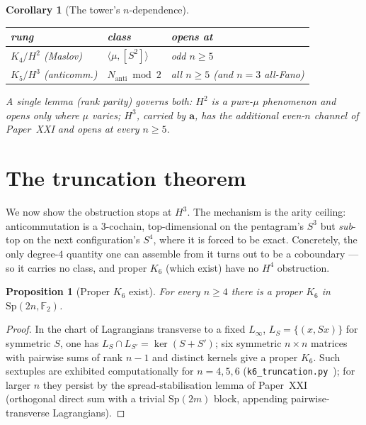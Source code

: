 \documentclass[11pt,a4paper]{article}
\newcommand{\Nanti}{N_{\mathrm{anti}}}
\newcommand{\Sp}{\mathrm{Sp}}
\newcommand{\F}{\mathbb{F}}
\theoremstyle{plain}
\newtheorem{corollary}[theorem]{Corollary}
\newtheorem{proposition}[theorem]{Proposition}
\theoremstyle{definition}
\theoremstyle{remark}
\begin{document}
\begin{corollary}[The tower's $n$-dependence]\label{cor:ndep}
\begin{center}
\renewcommand{\arraystretch}{1.2}
\begin{tabular}{lll}
\toprule
rung & class & opens at \\
\midrule
$K_4/H^2$ (Maslov) & $\langle\mu,[S^2]\rangle$ & odd $n\ge5$ \\
$K_5/H^3$ (anticomm.) & $\Nanti\bmod2$ & all $n\ge5$ \;(and $n=3$ all-Fano)\\
\bottomrule
\end{tabular}
\end{center}
A single lemma (rank parity) governs both: $H^2$ is a pure-$\mu$ phenomenon and opens
only where $\mu$ varies; $H^3$, carried by $\mathbf a$, has the additional
even-$n$ channel of Paper~XXI and opens at every $n\ge5$.
\end{corollary}

\section{The truncation theorem}\label{sec:trunc}

We now show the obstruction stops at $H^3$.  The mechanism is the arity ceiling:
anticommutation is a $3$-cochain, top-dimensional on the pentagram's $S^3$ but
\emph{sub}-top on the next configuration's $S^4$, where it is forced to be exact.
Concretely, the only degree-$4$ quantity one can assemble from it turns out to be a
coboundary --- so it carries no class, and proper $K_6$ (which exist) have no
$H^4$ obstruction.

\begin{proposition}[Proper $K_6$ exist]\label{prop:k6exist}
For every $n\ge4$ there is a proper $K_6$ in $\Sp(2n,\F_2)$.
\end{proposition}

\begin{proof}
In the chart of Lagrangians transverse to a fixed $L_\infty$, $L_S=\{(x,Sx)\}$ for
symmetric $S$, one has $L_S\cap L_{S'}=\ker(S+S')$; six symmetric $n\times n$
matrices with pairwise sums of rank $n-1$ and distinct kernels give a proper $K_6$.
Such sextuples are exhibited computationally for $n=4,5,6$
(\texttt{k6\_truncation.py}~\cite{PaperXXIIsuppl}); for larger $n$ they persist by
the spread-stabilisation lemma of Paper~XXI~\cite{PaperXXI} (orthogonal direct sum
with a trivial $\Sp(2m)$ block, appending pairwise-transverse Lagrangians).
\end{proof}
\end{document}
